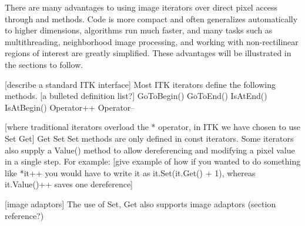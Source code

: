 There are many advantages to using image iterators over direct pixel access
through  and  methods.  Code is more
compact and often generalizes automatically to higher dimensions, algorithms
run much faster, and many tasks such as multithreading, neighborhood image
processing, and working with non-rectilinear regions of interest are greatly
simplified.  These advantages will be illustrated in the sections to follow. 





[describe a standard ITK interface]
Most ITK iterators define the following methods. [a bulleted definition list?]
        GoToBegin()
        GoToEnd()
        IsAtEnd()
        IsAtBegin()
        Operator++
        Operator--

[where traditional iterators overload the * operator, in ITK we have chosen to
use Set Get]
        Get
        Set
Set methods are only defined in const iterators.
Some iterators also supply a Value() method to allow dereferencing and modifying a
pixel value in a single step.  For example: [give example of how if you wanted
to do something like *it++ you would have to write it as it.Set(it.Get() + 1),
whereas it.Value()++ saves one dereference]

[image adaptors]
The use of Set, Get also supports image adaptors (section reference?)

